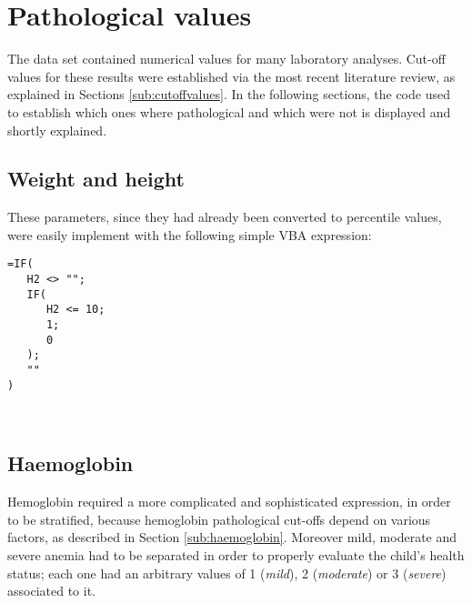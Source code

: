 \section{Pathological values}\label{sec:pathologicalvalues}
The data set contained numerical values for many laboratory analyses. Cut-off values for these results were established via the most recent literature review, as explained in Sections \ref{sub:cutoffvalues}. In the following sections, the code used to establish which ones where pathological and which were not is displayed and shortly explained.

\subsection{Weight and height}\label{sub:patweightandheight}
These parameters, since they had already been converted to percentile values, were easily implement with the following simple VBA expression:

\begin{minipage}{\linewidth}
\begin{lstlisting}
=IF(
   H2 <> "";
   IF(
      H2 <= 10;
      1;
      0
   );
   ""
)
\end{lstlisting}\
\end{minipage}

\subsection{Haemoglobin}\label{sub:pathaemoglobin}
Hemoglobin required a more complicated and sophisticated expression, in order to be stratified, because hemoglobin pathological cut-offs depend on various factors, as described in Section \ref{sub:haemoglobin}. Moreover mild, moderate and severe anemia had to be separated in order to properly evaluate the child's health status; each one had an arbitrary values of 1 (\textit{mild}), 2 (\textit{moderate}) or 3 (\textit{severe}) associated to it.

